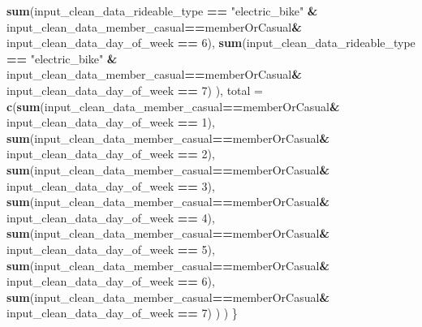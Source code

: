 \documentclass[
]{article}
\newenvironment{Shaded}{\begin{snugshade}}{\end{snugshade}}
\newcommand{\AttributeTok}[1]{\textcolor[rgb]{0.13,0.29,0.53}{#1}}
\newcommand{\DecValTok}[1]{\textcolor[rgb]{0.00,0.00,0.81}{#1}}
\newcommand{\FunctionTok}[1]{\textcolor[rgb]{0.13,0.29,0.53}{\textbf{#1}}}
\newcommand{\NormalTok}[1]{#1}
\newcommand{\SpecialCharTok}[1]{\textcolor[rgb]{0.81,0.36,0.00}{\textbf{#1}}}
\newcommand{\StringTok}[1]{\textcolor[rgb]{0.31,0.60,0.02}{#1}}
\begin{document}
\begin{Shaded}
\begin{Highlighting}[]
                                         \FunctionTok{sum}\NormalTok{(input\_clean\_data\_rideable\_type }\SpecialCharTok{==} \StringTok{"electric\_bike"} \SpecialCharTok{\&}\NormalTok{ input\_clean\_data\_member\_casual}\SpecialCharTok{==}\NormalTok{memberOrCasual}\SpecialCharTok{\&}\NormalTok{ input\_clean\_data\_day\_of\_week }\SpecialCharTok{==} \DecValTok{6}\NormalTok{),}
                                         \FunctionTok{sum}\NormalTok{(input\_clean\_data\_rideable\_type }\SpecialCharTok{==} \StringTok{"electric\_bike"} \SpecialCharTok{\&}\NormalTok{ input\_clean\_data\_member\_casual}\SpecialCharTok{==}\NormalTok{memberOrCasual}\SpecialCharTok{\&}\NormalTok{ input\_clean\_data\_day\_of\_week }\SpecialCharTok{==} \DecValTok{7}\NormalTok{)}
\NormalTok{                                       ),}
                       \AttributeTok{total =} \FunctionTok{c}\NormalTok{(}\FunctionTok{sum}\NormalTok{(input\_clean\_data\_member\_casual}\SpecialCharTok{==}\NormalTok{memberOrCasual}\SpecialCharTok{\&}\NormalTok{ input\_clean\_data\_day\_of\_week }\SpecialCharTok{==} \DecValTok{1}\NormalTok{),}
                                      \FunctionTok{sum}\NormalTok{(input\_clean\_data\_member\_casual}\SpecialCharTok{==}\NormalTok{memberOrCasual}\SpecialCharTok{\&}\NormalTok{ input\_clean\_data\_day\_of\_week }\SpecialCharTok{==} \DecValTok{2}\NormalTok{),}
                                      \FunctionTok{sum}\NormalTok{(input\_clean\_data\_member\_casual}\SpecialCharTok{==}\NormalTok{memberOrCasual}\SpecialCharTok{\&}\NormalTok{ input\_clean\_data\_day\_of\_week }\SpecialCharTok{==} \DecValTok{3}\NormalTok{),}
                                      \FunctionTok{sum}\NormalTok{(input\_clean\_data\_member\_casual}\SpecialCharTok{==}\NormalTok{memberOrCasual}\SpecialCharTok{\&}\NormalTok{ input\_clean\_data\_day\_of\_week }\SpecialCharTok{==} \DecValTok{4}\NormalTok{),}
                                      \FunctionTok{sum}\NormalTok{(input\_clean\_data\_member\_casual}\SpecialCharTok{==}\NormalTok{memberOrCasual}\SpecialCharTok{\&}\NormalTok{ input\_clean\_data\_day\_of\_week }\SpecialCharTok{==} \DecValTok{5}\NormalTok{),}
                                      \FunctionTok{sum}\NormalTok{(input\_clean\_data\_member\_casual}\SpecialCharTok{==}\NormalTok{memberOrCasual}\SpecialCharTok{\&}\NormalTok{ input\_clean\_data\_day\_of\_week }\SpecialCharTok{==} \DecValTok{6}\NormalTok{),}
                                      \FunctionTok{sum}\NormalTok{(input\_clean\_data\_member\_casual}\SpecialCharTok{==}\NormalTok{memberOrCasual}\SpecialCharTok{\&}\NormalTok{ input\_clean\_data\_day\_of\_week }\SpecialCharTok{==} \DecValTok{7}\NormalTok{)}
\NormalTok{                                      )}
\NormalTok{  )}
\NormalTok{\}}
\end{Highlighting}
\end{Shaded}
\end{document}
